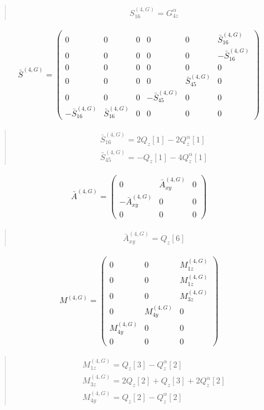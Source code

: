\documentclass[fleqn,10pt]{jsarticle}
\begin{document}
\begin{quote}
\begin{align*}
& S^{(4,G)}_{16} = G_{4z}^{\alpha}
\end{align*}
\end{quote}
\begin{align*}
\bar{S}^{(4,G)} = \begin{pmatrix} 0 & 0 & 0 & 0 & 0 & \bar{S}^{(4,G)}_{16} \\ 0 & 0 & 0 & 0 & 0 & - \bar{S}^{(4,G)}_{16} \\ 0 & 0 & 0 & 0 & 0 & 0 \\ 0 & 0 & 0 & 0 & \bar{S}^{(4,G)}_{45} & 0 \\ 0 & 0 & 0 & - \bar{S}^{(4,G)}_{45} & 0 & 0 \\ - \bar{S}^{(4,G)}_{16} & \bar{S}^{(4,G)}_{16} & 0 & 0 & 0 & 0 \end{pmatrix}
\end{align*}
\begin{quote}
\begin{align*}
& \bar{S}^{(4,G)}_{16} = 2 Q_{z}[1] - 2 Q_{z}^{\alpha}[1] \\
& \bar{S}^{(4,G)}_{45} = - Q_{z}[1] - 4 Q_{z}^{\alpha}[1]
\end{align*}
\end{quote}
\begin{align*}
\bar{A}^{(4,G)} = \begin{pmatrix} 0 & \bar{A}^{(4,G)}_{xy} & 0 \\ - \bar{A}^{(4,G)}_{xy} & 0 & 0 \\ 0 & 0 & 0 \end{pmatrix}
\end{align*}
\begin{quote}
\begin{align*}
& \bar{A}^{(4,G)}_{xy} = Q_{z}[6]
\end{align*}
\end{quote}
\begin{align*}
M^{(4,G)} = \begin{pmatrix} 0 & 0 & M^{(4,G)}_{1z} \\ 0 & 0 & M^{(4,G)}_{1z} \\ 0 & 0 & M^{(4,G)}_{3z} \\ 0 & M^{(4,G)}_{4y} & 0 \\ M^{(4,G)}_{4y} & 0 & 0 \\ 0 & 0 & 0 \end{pmatrix}
\end{align*}
\begin{quote}
\begin{align*}
& M^{(4,G)}_{1z} = Q_{z}[3] - Q_{z}^{\alpha}[2] \\
& M^{(4,G)}_{3z} = 2 Q_{z}[2] + Q_{z}[3] + 2 Q_{z}^{\alpha}[2] \\
& M^{(4,G)}_{4y} = Q_{z}[2] - Q_{z}^{\alpha}[2]
\end{align*}
\end{quote}
\end{document}
